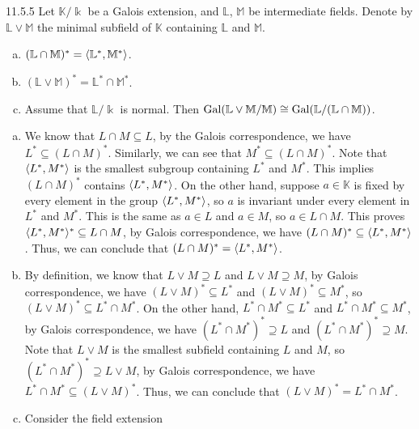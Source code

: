 \documentclass[a4paper, 12pt]{article}
\begin{document}
\begin{problem}{11.5.5}
Let \(\mathbb{K}/\Bbbk\) be a Galois extension, and \(\mathbb{L}\), \(\mathbb{M}\) be intermediate fields. Denote by \(\mathbb{L}\vee \mathbb{M}\) the minimal subfield of \(\mathbb{K}\) containing 
\(\mathbb{L}\) and \(\mathbb{M}\). 
\begin{enumerate}[(a)]
\item \((\mathbb{L}\cap \mathbb{M})^*=\langle \mathbb{L}^*,\mathbb{M}^*\rangle\).
\item \((\mathbb{L}\vee \mathbb{M})^*=\mathbb{L}^*\cap \mathbb{M}^*\).
\item Assume that \(\mathbb{L}/\Bbbk\) is normal. Then \(\text{Gal}(\mathbb{L}\vee \mathbb{M}/\mathbb{M})\cong \text{Gal}(\mathbb{L}/(\mathbb{L}\cap \mathbb{M}))\).
\end{enumerate}
\end{problem}
\begin{solution}
\begin{enumerate}[(a)]
\item We know that \(L\cap M\subseteq L\), by the Galois correspondence, we have \(L^*\subseteq (L\cap M)^*\). Similarly, we can see that \(M^*\subseteq (L\cap M)^*\). Note that \(\langle L^*, M^*\rangle\) is the smallest subgroup containing \(L^*\) and \(M^*\). This implies 
\((L\cap M)^*\) contains \(\langle L^*,M^*\rangle\). On the other hand, suppose \(a\in \mathbb{K}\) is fixed by every element in the group \(\langle L^*,M^*\rangle\), so \(a\) is invariant under every element in \(L^*\) and \(M^*\). This is the same as \(a\in L\) and \(a\in M\), so \(a\in L\cap M\). This proves 
\(\langle L^*,M^*\rangle^*\subseteq L\cap M\), by Galois correspondence, we have \((L\cap M)^*\subseteq \langle L^*,M^*\rangle\). Thus, we can conclude that \((L\cap M)^*=\langle L^*,M^*\rangle\). 
\item By definition, we know that \(L\vee M\supseteq L\) and \(L\vee M\supseteq M\), by Galois correspondence, we have \((L\vee M)^*\subseteq L^*\) and \((L\vee M)^*\subseteq M^*\), so \((L\vee M)^*\subseteq L^*\cap M^*\). On the other hand, \(L^*\cap M^*\subseteq L^*\) and \(L^*\cap M^*\subseteq M^*\), by Galois correspondence, we have 
\((L^*\cap M^*)^*\supseteq L\) and \((L^*\cap M^*)^*\supseteq M\). Note that \(L\vee M\) is the smallest subfield containing \(L\) and \(M\), so \((L^*\cap M^*)^*\supseteq L\vee M\), by Galois correspondence, we have \(L^*\cap M^*\subseteq (L\vee M)^*\). Thus, we can conclude that \((L\vee M)^*=L^*\cap M^*\). 
\item Consider the field extension 
\end{enumerate}
\end{solution}
\end{document}
